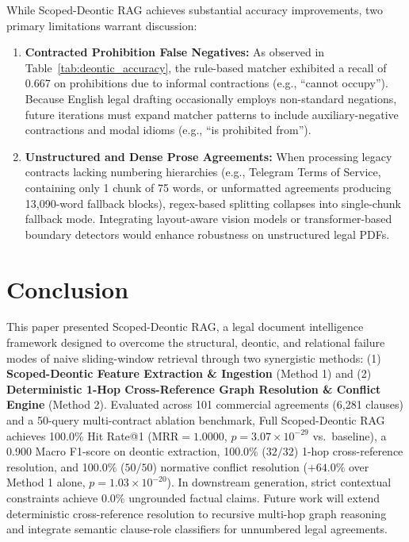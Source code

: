 \documentclass[conference]{IEEEtran}
\begin{document}
While Scoped-Deontic RAG achieves substantial accuracy improvements, two primary limitations warrant discussion:
\begin{enumerate}
    \item \textbf{Contracted Prohibition False Negatives:} As observed in Table~\ref{tab:deontic_accuracy}, the rule-based matcher exhibited a recall of 0.667 on prohibitions due to informal contractions (e.g., ``cannot occupy''). Because English legal drafting occasionally employs non-standard negations, future iterations must expand matcher patterns to include auxiliary-negative contractions and modal idioms (e.g., ``is prohibited from'').
    \item \textbf{Unstructured and Dense Prose Agreements:} When processing legacy contracts lacking numbering hierarchies (e.g., Telegram Terms of Service, containing only 1 chunk of 75 words, or unformatted agreements producing 13,090-word fallback blocks), regex-based splitting collapses into single-chunk fallback mode. Integrating layout-aware vision models or transformer-based boundary detectors would enhance robustness on unstructured legal PDFs.
\end{enumerate}

\section{Conclusion}
This paper presented Scoped-Deontic RAG, a legal document intelligence framework designed to overcome the structural, deontic, and relational failure modes of naive sliding-window retrieval through two synergistic methods: (1) \textbf{Scoped-Deontic Feature Extraction \& Ingestion} (Method 1) and (2) \textbf{Deterministic 1-Hop Cross-Reference Graph Resolution \& Conflict Engine} (Method 2). Evaluated across 101 commercial agreements (6,281 clauses) and a 50-query multi-contract ablation benchmark, Full Scoped-Deontic RAG achieves 100.0\% Hit Rate@1 ($\text{MRR} = 1.0000$, $p = 3.07 \times 10^{-29}$ vs.\ baseline), a 0.900 Macro F1-score on deontic extraction, 100.0\% ($32/32$) 1-hop cross-reference resolution, and 100.0\% ($50/50$) normative conflict resolution ($+64.0\%$ over Method 1 alone, $p = 1.03 \times 10^{-20}$). In downstream generation, strict contextual constraints achieve 0.0\% ungrounded factual claims. Future work will extend deterministic cross-reference resolution to recursive multi-hop graph reasoning and integrate semantic clause-role classifiers for unnumbered legal agreements.
\end{document}
